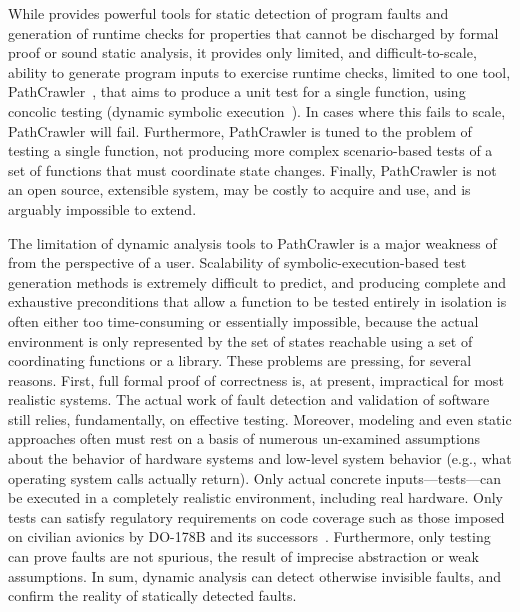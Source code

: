 While \framac{} provides powerful tools for static detection of program faults and generation of runtime checks for properties that cannot be discharged by formal proof or sound static analysis, it provides only limited, and difficult-to-scale, ability to generate program inputs to exercise runtime checks, limited to one tool, PathCrawler~\cite{WilliamsMMR05EDCC}, that aims to produce a unit test for a single function, using concolic testing (dynamic symbolic execution~\cite{GodefroidKS05}).  In cases where this fails to scale, PathCrawler will fail.  Furthermore, PathCrawler is tuned to the problem of testing a single function, not producing more complex scenario-based tests of a set of functions that must coordinate state changes.  Finally, PathCrawler is not an open source, extensible system, may be costly to acquire and use, and is arguably impossible to extend.

The limitation of dynamic analysis tools to PathCrawler is a major weakness of \framac from the perspective of a user.  Scalability of symbolic-execution-based test generation methods is extremely difficult to predict, and producing complete and exhaustive preconditions that allow a function to be tested entirely in isolation is often either too time-consuming or essentially impossible, because the actual environment is only represented by the set of states reachable using a set of coordinating functions or a library.  These problems are pressing, for several reasons.  First, full formal proof of correctness is, at present, impractical for most realistic systems.  The actual work of fault detection and validation of software still relies, fundamentally, on effective testing.  Moreover, modeling and even static approaches often must rest on a basis of numerous un-examined assumptions about the behavior of hardware systems and low-level system behavior (e.g., what operating system calls actually return).  Only actual concrete inputs---tests---can be executed in a completely realistic environment, including real hardware.  Only tests can satisfy regulatory requirements on code coverage such as those imposed on civilian avionics by DO-178B and its successors~\cite{MCDC}.  Furthermore, only testing can prove faults are not spurious, the result of imprecise abstraction or weak assumptions.
In sum, dynamic analysis can detect otherwise invisible faults, and confirm the reality of statically detected faults.

